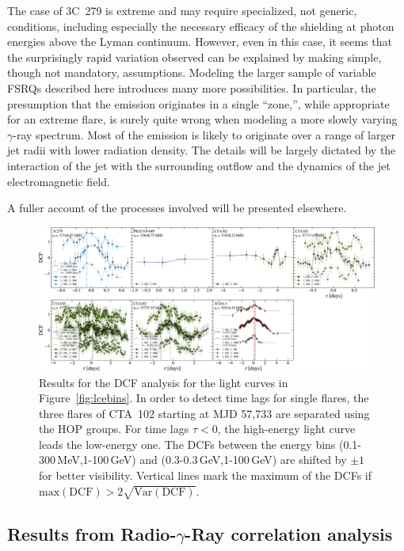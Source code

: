 \documentclass[twocolumn]{aastex62}
\newcommand{\GRay}{$\gamma$-Ray\xspace}
\newcommand{\gray}{$\gamma$-ray\xspace}
\begin{document}
The  case of 3C~279 is extreme and may require specialized, not generic, conditions, including especially the necessary efficacy of the shielding at photon energies above the Lyman continuum. However, even in this case, it seems that the surprisingly rapid variation observed can be explained by making simple, though not mandatory, assumptions. Modeling the larger sample of variable FSRQs described here introduces many more possibilities. In particular, the presumption that the emission originates in a single ``zone,'', while appropriate for an extreme flare, is surely quite wrong when modeling a more slowly varying \gray spectrum. Most of the emission is likely to originate over a range of larger jet radii with lower radiation density. The details will be largely dictated by the interaction of the jet with the surrounding outflow and the dynamics of the jet electromagnetic field.

A fuller account of the processes involved will be presented elsewhere.

\begin{figure}
    \centering
    \includegraphics[width = .9 \linewidth]{zdcf_ebins.pdf}
    \caption{Results for the DCF analysis for the light curves in Figure~\ref{fig:lcebins}. In order to detect time lags for single flares, the three flares of CTA~102 starting at MJD 57,733 are separated using the HOP groups. For time lags $\tau < 0$, the high-energy light curve leads the low-energy one. The DCFs between the energy bins (0.1-300\,MeV,1-100\,GeV) and (0.3-0.3\,GeV,1-100\,GeV) are shifted by $\pm 1$ for better visibility. 
    Vertical lines mark the maximum of the DCFs if $\mathrm{max}(\mathrm{DCF}) > 2 \sqrt{\mathrm{Var}(\mathrm{DCF})}$.}
    \label{fig:zdcf}
\end{figure}

\subsection{Results from Radio-\GRay correlation analysis}
\label{sec:gammaradio}
\end{document}
